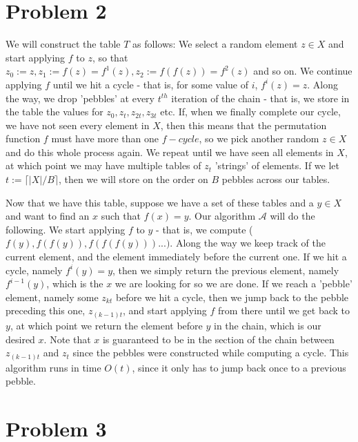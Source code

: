 \documentclass{article}
\begin{document}
\section*{Problem 2}
We will construct the table $T$ as follows: We select a random element $z \in X$ and start applying $f$ to $z$, so that $z_0 := z, z_1 := f(z) = f^1(z), z_2 := f(f(z)) = f^2(z)$ and so on. We continue applying $f$ until we hit a cycle - that is, for some value of $i$, $f^i(z) = z$. Along the way, we drop 'pebbles' at every $t^{th}$ iteration of the chain - that is, we store in the table the values for $z_0, z_t, z_{2t}, z_{3t}$ etc. If, when we finally complete our cycle, we have not seen every element in $X$, then this means that the permutation function $f$ must have more than one $f-cycle$, so we pick another random $z \in X$ and do this whole process again. We repeat until we have seen all elements in $X$, at which point we may have multiple tables of $z_t$ 'strings' of elements. If we let $t := \lceil |X| / B \rceil$, then we will store on the order on $B$ pebbles across our tables. 

Now that we have this table, suppose we have a set of these tables and a $y \in X$ and want to find an $x$ such that $f(x) = y$. Our algorithm $\mathcal{A}$ will do the following. We start applying $f$ to $y$ - that is, we compute ($f(y), f(f(y)), f(f(f(y))) ...)$. Along the way we keep track of the current element, and the element immediately before the current one. If we hit a cycle, namely $f^i(y) = y$, then we simply return the previous element, namely $f^{i-1}(y)$, which is the $x$ we are looking for so we are done. If we reach a 'pebble' element, namely some $z_{kt}$ before we hit a cycle, then we jump back to the pebble preceding this one, $z_{(k-1)t}$, and start applying $f$ from there until we get back to $y$, at which point we return the element before $y$ in the chain, which is our desired $x$. Note that $x$ is guaranteed to be in the section of the chain between $z_{(k-1)t}$ and $z_{t}$ since the pebbles were constructed while computing a cycle. This algorithm runs in time $O(t)$, since it only has to jump back once to a previous pebble.

\section*{Problem 3}
\end{document}
